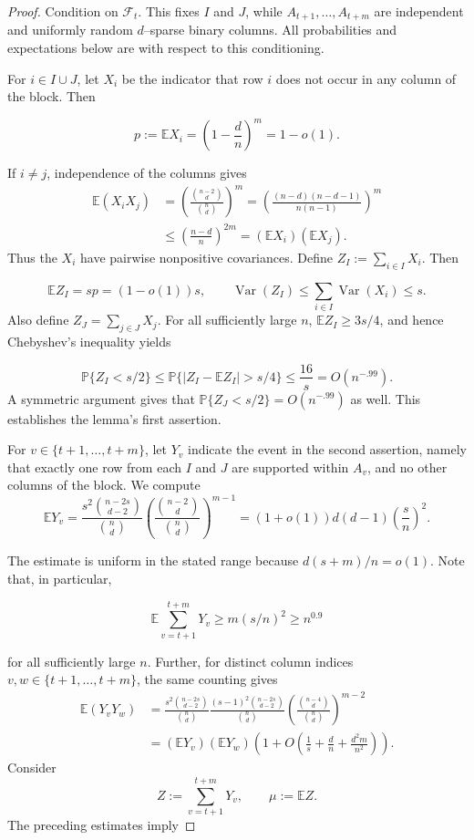 \documentclass[reqno,english]{amsart}
\newcommand*{\PP}{\mathbb P}
\newcommand*{\EE}{\mathbb E}
\newcommand*{\calF}{\mathcal F}
\newcommand*{\Var}{\operatorname{Var}}
\theoremstyle{definition}
\begin{document}
\begin{proof}
Condition on $\calF_t$. This fixes $I$ and $J$, while
$A_{t+1},\ldots,A_{t+m}$ are independent and uniformly random $d$--sparse
binary columns. All probabilities and expectations below are with respect to this conditioning.

For $i\in I\cup J$, let $X_i$ be the indicator that row $i$ does not occur in
any column of the block. Then

$$
    p:=\EE X_i=\left(1-\frac dn\right)^m=1-o(1).
$$

If $i\ne j$, independence of the columns gives
\begin{align*}
\EE(X_iX_j)
&=\left(\frac{\binom{n-2}{d}}{\binom nd}\right)^m
=\left(\frac{(n-d)(n-d-1)}{n(n-1)}\right)^m \\
&{\le} \left(\frac{n-d}{n}\right)^{2m}
=(\EE X_i)(\EE X_j).
\end{align*}
Thus the $X_i$ have pairwise nonpositive covariances. Define $Z_I:=\sum_{i\in I}X_i$. Then

$$
    \EE Z_I=sp=(1-o(1))s,
    \qquad
    \Var(Z_I)\le\sum_{i\in I}\Var(X_i)\le s.
$$
Also define $Z_J = {\sum_{j \in J}X_j}$. For all sufficiently large $n$, $\EE Z_I\ge3s/4$, and hence Chebyshev's
inequality yields

$$
    \PP\{Z_I<s/2\}
    \le \PP\{|Z_I-\EE Z_I|>s/4\}
    \le \frac{16}{s}=O(n^{-.99}).
$$
A symmetric argument gives that $\PP\{Z_J < s/2\} = O(n^{-.99})$ as well. This establishes {the lemma's first assertion}.

For $v\in{\{t+1,\ldots,t+m\}}$, let $Y_v$ indicate the event in the second
assertion, namely that exactly one row from each $I$ and $J$ are supported within $A_v$, and no other columns of the block. We compute
$$
    \EE Y_v
    =\frac{s^2\binom{n-2s}{d-2}}{\binom nd}
      \left(\frac{\binom{n-2}{d}}{\binom nd}\right)^{m-1}
    =(1+o(1))d(d-1)\left(\frac{s}{n}\right)^2.
$$

The estimate is uniform in the stated range because
$d(s+m)/n=o(1)$. Note that, in particular,

$$
    \EE\sum_{v=t+1}^{t+m}Y_v
    \ge m(s/n)^2\ge n^{0.9}
$$

for all sufficiently large $n$. Further, for distinct column indices
$v,w\in{\{t+1,\ldots,t+m\}}$, the same counting gives
\begin{align*}
\EE(Y_vY_w)
&=
\frac{s^2\binom{n-2s}{d-2}}{\binom nd}
\frac{(s-1)^2\binom{n-2s}{d-2}}{\binom nd}
\left(\frac{\binom{n-4}{d}}{\binom nd}\right)^{m-2} \\
&={(\EE Y_v)(\EE Y_w)}
\left(1+O\left(\frac1s+\frac dn+\frac{d^2m}{n^2}\right)\right).
\end{align*}
Consider
$$
    Z:=\sum_{v=t+1}^{t+m}Y_v,
    \qquad
    \mu:=\EE Z.
$$
The preceding estimates imply


\end{proof}
\end{document}
